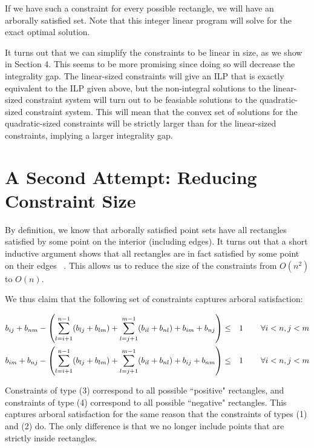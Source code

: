 \documentclass[11pt]{article}
\begin{document}
If we have such a constraint for every possible rectangle, we will have an arborally satisfied set. Note that this integer linear program will solve for the exact optimal solution.

It turns out that we can simplify the constraints to be linear in size, as we show in Section 4. This seems to be more promising since doing so will decrease the integrality gap. The linear-sized constraints will give an ILP that is exactly equivalent to the ILP given above, but the non-integral solutions to the linear-sized constraint system will turn out to be feasiable solutions to the quadratic-sized constraint system. This will mean that the convex set of solutions for the quadratic-sized constraints will be strictly larger than for the linear-sized constraints, implying a larger integrality gap. 

\section{A Second Attempt: Reducing Constraint Size}
\label{A Second Attempt: Reducing Constraint Size}

By definition, we know that arborally satisfied point sets have all rectangles satisfied by some point on the interior (including edges). It turns out that a short inductive argument shows that all rectangles are in fact satisfied by some point on their edges ~\cite{geometryBST}. This allows us to reduce the size of the constraints from $O(n^2)$ to $O(n)$.

We thus claim that the following set of constraints captures arboral satisfaction: 

\begin{align}
b_{ij} + b_{nm} - \left(\sum_{l=i+1}^{n-1} (b_{lj}+b_{lm}) + \sum_{l=j+1}^{m-1} (b_{il} + b_{nl}) + b_{im} + b_{nj} \right) &\leq& 1 & \hspace{.3in} \forall i<n, j<m \\
b_{im} + b_{nj} - \left(\sum_{l=i+1}^{n-1} (b_{lj}+b_{lm}) + \sum_{l=j+1}^{m-1} (b_{il} + b_{nl}) + b_{ij} + b_{nm} \right) &\leq& 1 & \hspace{.3in} \forall i<n, j<m
\end{align}

Constraints of type (3) correspond to all possible ``positive" rectangles, and constraints of type (4) correspond to all possible ``negative" rectangles. This captures arboral satisfaction for the same reason that the constraints of types (1) and (2) do. The only difference is that we no longer include points that are strictly inside rectangles.
\end{document}
